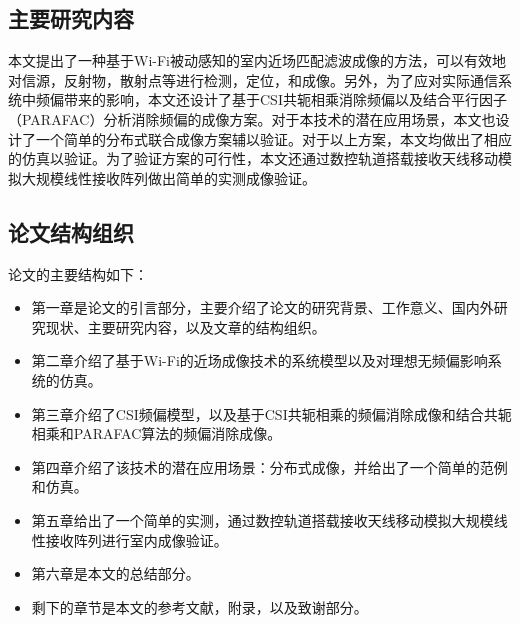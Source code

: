 \subsection{主要研究内容}
本文提出了一种基于Wi-Fi被动感知的室内近场匹配滤波成像的方法，可以有效地对信源，反射物，散射点等进行检测，定位，和成像。另外，为了应对实际通信系统中频偏带来的影响，本文还设计了基于CSI共轭相乘消除频偏以及结合平行因子（PARAFAC）分析消除频偏的成像方案。对于本技术的潜在应用场景，本文也设计了一个简单的分布式联合成像方案辅以验证。对于以上方案，本文均做出了相应的仿真以验证。为了验证方案的可行性，本文还通过数控轨道搭载接收天线移动模拟大规模线性接收阵列做出简单的实测成像验证。

\subsection{论文结构组织}
论文的主要结构如下：
\begin{itemize}
    \item 第一章是论文的引言部分，主要介绍了论文的研究背景、工作意义、国内外研究现状、主要研究内容，以及文章的结构组织。
    \item 第二章介绍了基于Wi-Fi的近场成像技术的系统模型以及对理想无频偏影响系统的仿真。
    \item 第三章介绍了CSI频偏模型，以及基于CSI共轭相乘的频偏消除成像和结合共轭相乘和PARAFAC算法的频偏消除成像。
    \item 第四章介绍了该技术的潜在应用场景：分布式成像，并给出了一个简单的范例和仿真。
    \item 第五章给出了一个简单的实测，通过数控轨道搭载接收天线移动模拟大规模线性接收阵列进行室内成像验证。
    \item 第六章是本文的总结部分。
    \item 剩下的章节是本文的参考文献，附录，以及致谢部分。
\end{itemize}